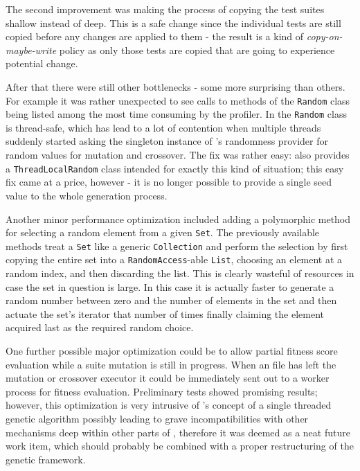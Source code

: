 The second improvement was making the process of copying the test suites shallow instead of deep. 
This is a safe change since the individual tests are still copied before any changes are applied 
to them - the result is a kind of \emph{copy-on-maybe-write} policy as only those tests are copied 
that are going to experience potential change.

After that there were still other bottlenecks - some more surprising than others. For example 
it was rather unexpected to see calls to methods of the \texttt{Random} class being listed among the most time
consuming by the profiler. In  the \texttt{Random} class is thread-safe, which has lead to a lot of 
contention when multiple threads suddenly started asking the singleton instance of \evosuite's randomness 
provider for random values for mutation and crossover. The fix was rather easy:  also provides 
a \texttt{ThreadLocalRandom} class intended for exactly this kind of situation; this easy fix came 
at a price, however - it is no longer possible to provide a single seed value to the whole generation 
process.

Another minor performance optimization included adding a polymorphic method for selecting a random 
element from a given \texttt{Set}. The previously available methods treat a \texttt{Set} like a 
generic \texttt{Collection} and perform the selection by first copying the entire set into a 
\texttt{RandomAccess}-able \texttt{List}, choosing an element at a random index, and then discarding the list.
This is clearly wasteful of resources in case the set in question is large. In this case it is actually faster
to generate a random number between zero and the number of elements in the set and then actuate the set's
iterator that number of times finally claiming the element acquired last as the required random choice.

One further possible major optimization could be to allow partial fitness score evaluation while a suite 
mutation is still in progress. When an \xml file has left the mutation or crossover executor it could be 
immediately sent out to a worker process for fitness evaluation. Preliminary tests showed promising 
results; however, this optimization is very intrusive of \evosuite's concept of a single threaded 
genetic algorithm possibly leading to grave incompatibilities with other mechanisms deep within other parts 
of \evosuite, therefore it was deemed as a neat future work item, which should probably be combined with a 
proper restructuring of the genetic framework.

